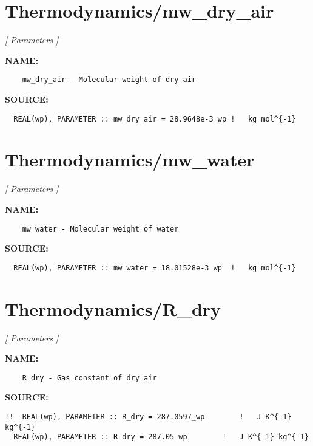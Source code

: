 \section{Thermodynamics/mw\_dry\_air}
\textsl{[ Parameters ]}

\label{ch:robo98}
\label{ch:Thermodynamics_mw_dry_air}
\textbf{NAME:}\hspace{0.08in}\begin{Verbatim}
    mw_dry_air - Molecular weight of dry air
\end{Verbatim}
\textbf{SOURCE:}\hspace{0.08in}\begin{Verbatim}
  REAL(wp), PARAMETER :: mw_dry_air = 28.9648e-3_wp !   kg mol^{-1}
\end{Verbatim}
\section{Thermodynamics/mw\_water}
\textsl{[ Parameters ]}

\label{ch:robo99}
\label{ch:Thermodynamics_mw_water}
\textbf{NAME:}\hspace{0.08in}\begin{Verbatim}
    mw_water - Molecular weight of water
\end{Verbatim}
\textbf{SOURCE:}\hspace{0.08in}\begin{Verbatim}
  REAL(wp), PARAMETER :: mw_water = 18.01528e-3_wp  !   kg mol^{-1}
\end{Verbatim}
\section{Thermodynamics/R\_dry}
\textsl{[ Parameters ]}

\label{ch:robo100}
\label{ch:Thermodynamics_R_dry}
\textbf{NAME:}\hspace{0.08in}\begin{Verbatim}
    R_dry - Gas constant of dry air
\end{Verbatim}
\textbf{SOURCE:}\hspace{0.08in}\begin{Verbatim}
!!  REAL(wp), PARAMETER :: R_dry = 287.0597_wp        !   J K^{-1} kg^{-1}
  REAL(wp), PARAMETER :: R_dry = 287.05_wp        !   J K^{-1} kg^{-1}
\end{Verbatim}

